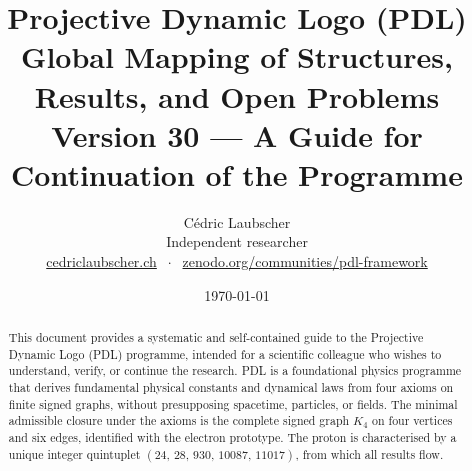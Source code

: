 \documentclass[11pt,a4paper]{article}
\title{Projective Dynamic Logo (PDL)\\[4pt]
\large Global Mapping of Structures, Results, and Open Problems\\[2pt]
\normalsize Version 30 --- A Guide for Continuation of the Programme}
\author{C\'edric Laubscher\\[4pt]
\small Independent researcher\\
\small \href{https://cedriclaubscher.ch}{cedriclaubscher.ch}
$\;\cdot\;$
\small \href{https://zenodo.org/communities/pdl-framework/}{zenodo.org/communities/pdl-framework}}
\date{\today}
\theoremstyle{plain}
\theoremstyle{definition}
\theoremstyle{remark}
\newcommand{\Kfour}{K_4}
\newcommand{\quintuplet}{(24,\,28,\,930,\,10087,\,11017)}
\begin{document}
\maketitle
\setcounter{tocdepth}{2}

\begin{abstract}
This document provides a systematic and self-contained guide to the Projective Dynamic Logo (PDL) programme, intended for a scientific colleague who wishes to understand, verify, or continue the research. PDL is a foundational physics programme that derives fundamental physical constants and dynamical laws from four axioms on finite signed graphs, without presupposing spacetime, particles, or fields. The minimal admissible closure under the axioms is the complete signed graph $\Kfour$ on four vertices and six edges, identified with the electron prototype. The proton is characterised by a unique integer quintuplet $\quintuplet$, from which all results flow.


\end{abstract}
\end{document}
